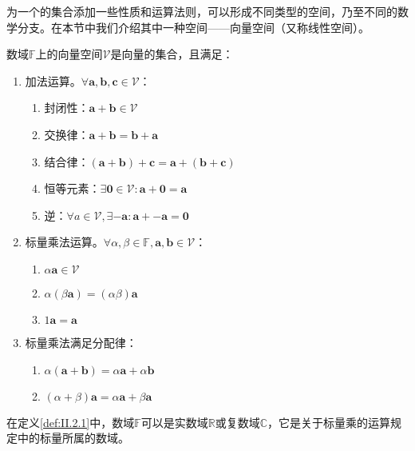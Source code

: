 \documentclass[main.tex]{subfiles}
\begin{document}
为一个的集合添加一些性质和运算法则，可以形成不同类型的空间，乃至不同的数学分支。在本节中我们介绍其中一种空间——向量空间（又称线性空间\cite{周胜林2012线性代数}）。

\begin{definition}[向量空间]\label{def:II.2.1}
数域$\mathbb{F}$上的向量空间$\mathcal{V}$是向量的集合，且满足：
\begin{enumerate}
\item 加法运算。$\forall\mathbf{a},\mathbf{b},\mathbf{c}\in \mathcal{V}$：
\begin{enumerate}
    \item 封闭性：$\mathbf{a}+\mathbf{b}\in\mathcal{V}$
    \item 交换律：$\mathbf{a}+\mathbf{b}=\mathbf{b}+\mathbf{a}$
    \item 结合律：$\left(\mathbf{a}+\mathbf{b}\right)+\mathbf{c}=\mathbf{a}+\left(\mathbf{b}+\mathbf{c}\right)$
    \item 恒等元素：$\exists \bm{0}\in\mathcal{V}:\mathbf{a}+\bm{0}=\mathbf{a}$
    \item 逆：$\forall a\in\mathcal{V},\exists -\mathbf{a}:\mathbf{a}+-\mathbf{a}=\bm{0}$
\end{enumerate}
\item 标量乘法运算。$\forall\alpha,\beta\in\mathbb{F},\mathbf{a},\mathbf{b}\in\mathcal{V}$：
\begin{enumerate}
    \item $\alpha\mathbf{a}\in\mathcal{V}$
    \item $\alpha\left(\beta\mathbf{a}\right)=\left(\alpha\beta\right)\mathbf{a}$
    \item $1\mathbf{a}=\mathbf{a}$
\end{enumerate}
\item 标量乘法满足分配律：
\begin{enumerate}
    \item $\alpha\left(\mathbf{a}+\mathbf{b}\right)=\alpha\mathbf{a}+\alpha\mathbf{b}$
    \item $\left(\alpha+\beta\right)\mathbf{a}=\alpha\mathbf{a}+\beta\mathbf{a}$
\end{enumerate}
\end{enumerate}
\end{definition}

在定义\ref{def:II.2.1}中，数域$\mathbb{F}$可以是实数域$\mathbb{R}$或复数域$\mathbb{C}$，它是关于标量乘的运算规定中的标量所属的数域。
\end{document}
